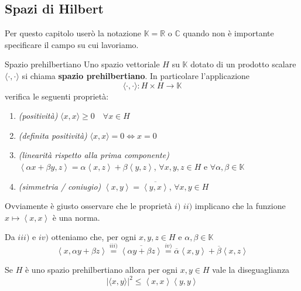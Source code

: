 \subsection{Spazi di Hilbert}
Per questo capitolo userò la notazione \(\mathbb{K} = \mathbb{R}\) o
\(\mathbb{C}\) quando non è importante specificare il campo su cui lavoriamo.
\begin{definition}{Spazio prehilbertiano}
    Uno spazio vettoriale \(H\) su \(\mathbb{K}\) dotato di un
    prodotto scalare \(\langle \cdot, \cdot \rangle\) si chiama \textbf{spazio
    prehilbertiano}. In particolare l'applicazione
    \[
        \langle \cdot, \cdot \rangle : H \times H \to \mathbb{K}
    \]
    verifica le seguenti proprietà:
\begin{enumerate}[label = \roman*)]
    \item \emph{(positività)} \(\langle x, x \rangle \ge 0 \quad \forall x \in H\)
    \item \emph{(definita positività)} \(\langle x, x \rangle = 0 \iff x = 0\)
    \item \emph{(linearità rispetto alla prima componente)} \(\left< \alpha x + \beta y, z \right> = \alpha \left<
        x, z\right> + \beta \left<y, z \right>\), \(\forall x, y, z \in H\) e
        \(\forall \alpha, \beta \in \mathbb{K}\) 
    \item \emph{(simmetria / coniugio)} \(\left< x, y \right> = \overline{\left<
        y, x \right>}\), \(\forall x, y \in H\) 
\end{enumerate}
\end{definition}
Ovviamente è giusto osservare che le proprietà \(i)\) \(ii)\) implicano che la
funzione \(x \mapsto \left<x, x \right>\) è una norma.
\begin{remark}
    Da \(iii)\) e \(iv)\) otteniamo che, per ogni \(x, y, z \in H\) e \(\alpha,
    \beta \in \mathbb{K}\) 
    \[
        \left<x, \alpha y + \beta z \right> \overset{iii)}{=}
        \overline{\left<\alpha y + \beta z \right>} \overset{iv)}{=}
        \overline{\alpha} \left<x, y
        \right> + \overline{\beta} \left<x, z \right>
    \]
\end{remark}
\begin{theorem}\label{thm:schwarz}
    Se \(H\) è uno spazio prehilbertiano allora per ogni \(x, y \in H\) vale la
    diseguaglianza
    \[
        |\langle x, y \rangle|^{2} \le \left<x, x \right> \left<y, y \right>
    \]
\end{theorem}
